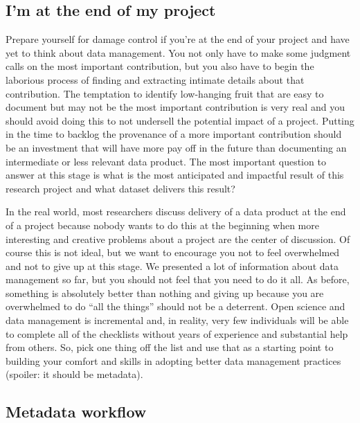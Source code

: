 \documentclass[
]{book}
\begin{document}
\subsection{I'm at the end of my project}\label{endproject}

Prepare yourself for damage control if you're at the end of your project and have yet to think about data management. You not only have to make some judgment calls on the most important contribution, but you also have to begin the laborious process of finding and extracting intimate details about that contribution. The temptation to identify low-hanging fruit that are easy to document but may not be the most important contribution is very real and you should avoid doing this to not undersell the potential impact of a project. Putting in the time to backlog the provenance of a more important contribution should be an investment that will have more pay off in the future than documenting an intermediate or less relevant data product. The most important question to answer at this stage is what is the most anticipated and impactful result of this research project and what dataset delivers this result?

In the real world, most researchers discuss delivery of a data product at the end of a project because nobody wants to do this at the beginning when more interesting and creative problems about a project are the center of discussion. Of course this is not ideal, but we want to encourage you not to feel overwhelmed and not to give up at this stage. We presented a lot of information about data management so far, but you should not feel that you need to do it all. As before, something is absolutely better than nothing and giving up because you are overwhelmed to do ``all the things'' should not be a deterrent. Open science and data management is incremental and, in reality, very few individuals will be able to complete all of the checklists without years of experience and substantial help from others. So, pick one thing off the list and use that as a starting point to building your comfort and skills in adopting better data management practices (spoiler: it should be metadata).

\subsection{Metadata workflow}\label{metadata-workflow}
\end{document}
